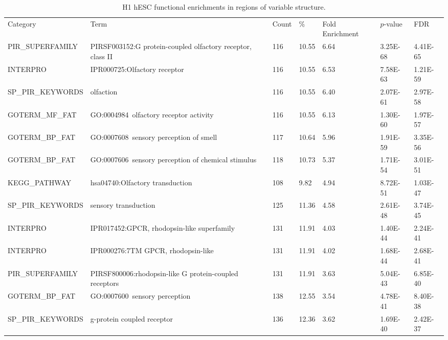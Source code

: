 \documentclass[a4paper,10pt,oneside]{book}
\begin{document}
{\scriptsize 
\begin{longtable}{lllllll}
\caption{
H1 hESC functional enrichments in regions of variable structure.
}\label{tab:h1go}\\
\endfirsthead

Category          & Term
& Count & \%    & Fold Enrichment & $p$-value   & FDR      \\
PIR\_SUPERFAMILY  & PIRSF003152:G protein-coupled olfactory receptor, class II      & 116   & 10.55 & 6.64            & 3.25E-68 & 4.41E-65 \\
INTERPRO          & IPR000725:Olfactory receptor                                    & 116   & 10.55 & 6.53            & 7.58E-63 & 1.21E-59 \\
SP\_PIR\_KEYWORDS & olfaction                                                       & 116   & 10.55 & 6.40            & 2.07E-61 & 2.97E-58 \\
GOTERM\_MF\_FAT   & GO:0004984~olfactory receptor activity                          & 116   & 10.55 & 6.13            & 1.30E-60 & 1.97E-57 \\
GOTERM\_BP\_FAT   & GO:0007608~sensory perception of smell                          & 117   & 10.64 & 5.96            & 1.91E-59 & 3.35E-56 \\
GOTERM\_BP\_FAT   & GO:0007606~sensory perception of chemical stimulus              & 118   & 10.73 & 5.37            & 1.71E-54 & 3.01E-51 \\
KEGG\_PATHWAY     & hsa04740:Olfactory transduction                                 & 108   & 9.82  & 4.94            & 8.72E-51 & 1.03E-47 \\
SP\_PIR\_KEYWORDS & sensory transduction                                            & 125   & 11.36 & 4.58            & 2.61E-48 & 3.74E-45 \\
INTERPRO          & IPR017452:GPCR, rhodopsin-like superfamily                      & 131   & 11.91 & 4.03            & 1.40E-44 & 2.24E-41 \\
INTERPRO          & IPR000276:7TM GPCR, rhodopsin-like                              & 131   & 11.91 & 4.02            & 1.68E-44 & 2.68E-41 \\
PIR\_SUPERFAMILY  & PIRSF800006:rhodopsin-like G protein-coupled receptors          & 131   & 11.91 & 3.63            & 5.04E-43 & 6.85E-40 \\
GOTERM\_BP\_FAT   & GO:0007600~sensory perception                                   & 138   & 12.55 & 3.54            & 4.78E-41 & 8.40E-38 \\
SP\_PIR\_KEYWORDS & g-protein coupled receptor                                      & 136   & 12.36 & 3.62            & 1.69E-40 & 2.42E-37 \\

\end{longtable}}
\end{document}
